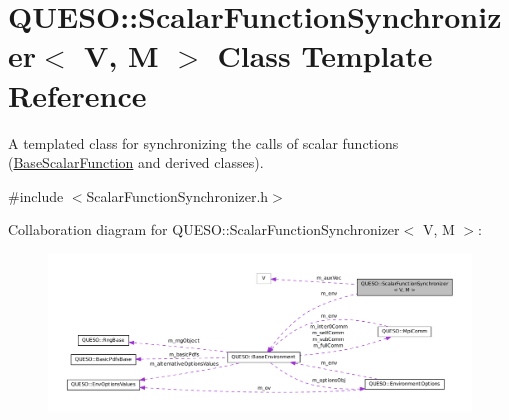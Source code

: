 \hypertarget{class_q_u_e_s_o_1_1_scalar_function_synchronizer}{\section{Q\-U\-E\-S\-O\-:\-:Scalar\-Function\-Synchronizer$<$ V, M $>$ Class Template Reference}
\label{class_q_u_e_s_o_1_1_scalar_function_synchronizer}
}


A templated class for synchronizing the calls of scalar functions (\hyperlink{class_q_u_e_s_o_1_1_base_scalar_function}{Base\-Scalar\-Function} and derived classes).  




{\ttfamily \#include $<$Scalar\-Function\-Synchronizer.\-h$>$}



Collaboration diagram for Q\-U\-E\-S\-O\-:\-:Scalar\-Function\-Synchronizer$<$ V, M $>$\-:
\nopagebreak
\begin{figure}[H]
\begin{center}
\leavevmode
\includegraphics[width=350pt]{class_q_u_e_s_o_1_1_scalar_function_synchronizer__coll__graph}
\end{center}
\end{figure}
